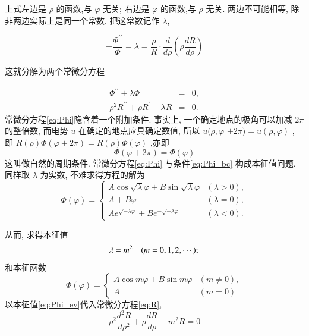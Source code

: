 上式左边是 $\rho$ 的函数,与 $\varphi$ 无关; 右边是 $\varphi$ 的函数,与 $\rho$ 无关.
 两边不可能相等, 除非两边实际上是同一个常数. 把这常数记作 $\lambda$,

$$
-\frac{\Phi^{\prime \prime}}{\Phi}=\lambda=\frac{\rho}{R} \cdot \frac{d}{d \rho}\left(\rho \frac{d R}{d \rho}\right)
$$

这就分解为两个常微分方程

\begin{eqnarray}
        \Phi^{\prime \prime}+\lambda \Phi &=& 0, \\
        \label{eq:Phi}
        \rho^{2} R^{\prime \prime}+\rho R^{'}-\lambda R  &=& 0.
        \label{eq:R}
\end{eqnarray}
常微分方程\eqref{eq:Phi}隐含着一个附加条件. 
事实上, 一个确定地点的极角可以加减 $2 \pi$ 的整倍数, 而电势 $u$ 在确定的地点应具确定数值, 
所以 $u(\rho, \varphi$ $+2 \pi)=u(\rho, \varphi)$ , 
即 $R(\rho) \Phi(\varphi+2 \pi)=R(\rho) \Phi(\varphi)$ ,亦即
\begin{equation}
    \Phi(\varphi+2 \pi)=\Phi(\varphi)
    \label{eq:Phi_bc}
\end{equation}
这叫做自然的周期条件. 常微分方程\eqref{eq:Phi} 与条件\eqref{eq:Phi_bc} 构成本征值问题. 
同样取 $\lambda$ 为实数, 不难求得方程的解为
\begin{equation}
\Phi(\varphi)= 
    \begin{cases}
        A \cos \sqrt{\lambda} \varphi+B \sin \sqrt{\lambda} \varphi & (\lambda>0), 
        \\ 
        A+B \varphi & (\lambda=0), 
        \\ 
        A e^{\sqrt{-\lambda \varphi}}+B e^{-\sqrt{-\lambda \varphi}} & (\lambda<0) .
    \end{cases}
\end{equation}

从而, 求得本征值
\begin{equation}
    \lambda =m^{2} \quad(m=0,1,2, \cdots) ; \\
    \label{eq:Phi_ev}
\end{equation}
和本征函数
\begin{equation}
\Phi(\varphi) = \begin{cases}A \cos m \varphi+B \sin m \varphi & (m \neq 0), \\
A & (m=0)\end{cases}
\label{eq:Phi_ef}
\end{equation}
以本征值\eqref{eq:Phi_ev}代入常微分方程\eqref{eq:R},
$$
\rho^{2} \frac{d^{2} R}{d \rho^{2}}+\rho \frac{d R}{d \rho}-m^{2} R=0
$$

